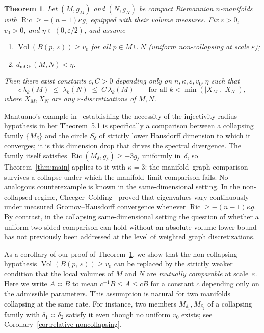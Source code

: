 \documentclass[10pt,reqno]{amsart}
\newtheorem{theorem}{Theorem}[section]
\theoremstyle{remark}
\newcommand{\Ric}{\operatorname{Ric}}
\newcommand{\Vol}{\operatorname{Vol}}
\newcommand{\B}[2]{B(#1,\,#2)}
\begin{document}
\begin{theorem}
\label{thm:mGH}
Let $(M,g_M)$ and $(N,g_N)$ be compact Riemannian $n$-manifolds with
$\Ric\geq-(n-1)\kappa g$, equipped with their volume measures. Fix
$\varepsilon>0$, $v_0>0$, and $\eta\in(0,\varepsilon/2)$, and assume
\begin{enumerate}[label=(\roman*)]
\item $\Vol(\B{p}{\varepsilon})\geq v_0$ for all $p\in M\cup N$
  (uniform non-collapsing at scale $\varepsilon$);
\item $d_{\mathrm{mGH}}(M,N)<\eta$.
\end{enumerate}
Then there exist constants $c,C>0$ depending only on
$n,\kappa,\varepsilon,v_0,\eta$ such that
\[
  c\,\lambda_k(M)\;\leq\;\lambda_k(N)\;\leq\;C\,\lambda_k(M)
  \qquad\text{for all }k<\min(|X_M|,|X_N|),
\]
where $X_M,X_N$ are any $\varepsilon$-discretizations of $M,N$.
\end{theorem}

Mantuano's example in~\cite[\S6]{Mantuano2005} establishing the
necessity of the injectivity radius hypothesis in her Theorem~5.1 is
specifically a comparison between a collapsing family $\{M_\delta\}$
and the circle $S_\delta$ of strictly lower Hausdorff dimension to
which it converges; it is this dimension drop that drives the spectral
divergence. The family itself satisfies
$\Ric(M_\delta,g_\delta)\geq-3g_\delta$ uniformly in~$\delta$, so
Theorem~\ref{thm:main} applies to it with $\kappa=3$: the
manifold--graph comparison survives a collapse under which the
manifold--limit comparison fails. No analogous
counterexample is known in the same-dimensional setting. In the
non-collapsed regime, Cheeger--Colding~\cite{CheegerColding2000}
proved that eigenvalues vary continuously under measured
Gromov--Hausdorff convergence whenever $\Ric\geq-(n-1)\kappa g$. By
contrast, in the collapsing same-dimensional setting the question of
whether a uniform two-sided comparison can hold without an absolute
volume lower bound has not previously been addressed at the level of
weighted graph discretizations.

As a corollary of our proof of Theorem~\ref{thm:mGH}, we show that the
non-collapsing hypothesis $\Vol(\B{p}{\varepsilon})\geq v_0$ can be
replaced by the strictly weaker condition that the local volumes of $M$
and $N$ are \emph{mutually comparable} at scale~$\varepsilon$. Here we
write $A\asymp B$ to mean $c^{-1}B\leq A\leq cB$ for a constant $c$
depending only on the admissible parameters. This assumption is natural
for two manifolds collapsing at the same rate. For instance, two members
$M_{\delta_1}, M_{\delta_2}$ of a collapsing family with
$\delta_1 \asymp \delta_2$ satisfy it even though no uniform $v_0$
exists; see Corollary~\ref{cor:relative-noncollapsing}. 
\end{document}
